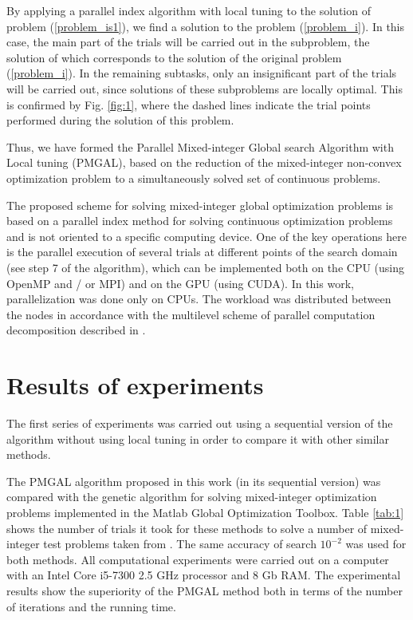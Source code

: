 \documentclass[
11pt,%
tightenlines,%
twoside,%
onecolumn,%
nofloats,%
nobibnotes,%
nofootinbib,%
superscriptaddress,%
noshowpacs,%
centertags]%
{revtex4}
\begin{document}
By applying a parallel index algorithm with local tuning to the solution of problem  (\ref{problem_is1}), we find a solution to the problem  (\ref{problem_i}). In this case, the main part of the trials will be carried out in the subproblem, the solution of which corresponds to the solution of the original problem (\ref{problem_i}). In the remaining subtasks, only an insignificant part of the trials will be carried out, since solutions of these subproblems are locally optimal. This is confirmed by Fig. \ref{fig:1}, where the dashed lines indicate the trial points performed during the solution of this problem.

Thus, we have formed the Parallel Mixed-integer Global search Algorithm with Local tuning (PMGAL), based on the reduction of the mixed-integer non-convex optimization problem to a simultaneously solved set of continuous problems.

The proposed scheme for solving mixed-integer global optimization problems is based on a parallel index method for solving continuous optimization problems and is not oriented to a specific computing device.  One of the key operations here is the parallel execution of several trials at different points of the search domain (see step 7 of the algorithm), which can be implemented both on the CPU (using OpenMP and / or MPI) and on the GPU (using CUDA). 
In this work, parallelization was done only on CPUs. The workload was distributed between the nodes in accordance with the multilevel scheme of parallel computation decomposition described in \cite{Strongin2018,Barkalov2020}.

\section{Results of experiments}

The first series of experiments was carried out using a sequential version of the algorithm without using local tuning in order to compare it with other similar methods.

The PMGAL algorithm proposed in this work (in its sequential version) was compared with the genetic algorithm for solving mixed-integer optimization problems implemented in the Matlab Global Optimization Toolbox. Table \ref{tab:1} shows the number of trials it took for these methods to solve a number of mixed-integer test problems taken from \cite{Deep,Floudas}. The same accuracy of search $10^{-2}$ was used for both methods. All computational experiments were carried out on a computer with an Intel Core i5-7300 2.5 GHz processor and 8 Gb RAM. The experimental results show the superiority of the PMGAL method both in terms of the number of iterations and the running time.
\end{document}
